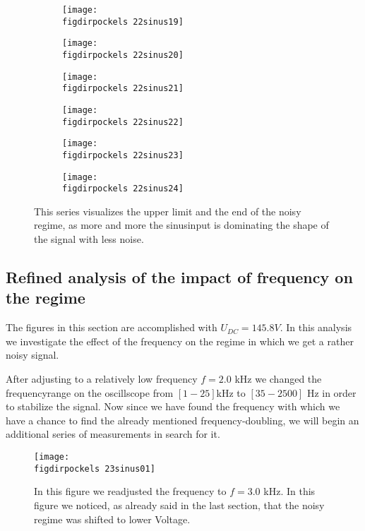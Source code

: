\begin{figure}
    \begin{subfigure}[b]{\picwidth}
        \texttt{[image: \\figdirpockels 22sinus19]}
        \caption{}
    \end{subfigure}\qquad
    \begin{subfigure}[b]{\picwidth}
        \texttt{[image: \\figdirpockels 22sinus20]}
        \caption{}
    \end{subfigure}
    \begin{subfigure}[b]{\picwidth}
        \texttt{[image: \\figdirpockels 22sinus21]}
        \caption{}
    \end{subfigure}
    \begin{subfigure}[b]{\picwidth}
        \texttt{[image: \\figdirpockels 22sinus22]}
        \caption{}
    \end{subfigure}
    \begin{subfigure}[b]{\picwidth}
        \texttt{[image: \\figdirpockels 22sinus23]}
        \caption{}
    \end{subfigure}
    \begin{subfigure}[b]{\picwidth}
        \texttt{[image: \\figdirpockels 22sinus24]}
        \caption{}
    \end{subfigure}

    \caption{This series visualizes the upper limit and the end
        of the noisy regime, as more and more the sinusinput
        is dominating the shape of the signal with less noise.}
    \label{fig:sinus4}
\end{figure}
\clearpage
\subsection{Refined analysis of the impact of frequency on 
    the regime}
The figures in this section are accomplished with $U_{DC}=145.8 V$.
In this analysis we investigate the effect of the frequency
on the regime in which we get a rather noisy signal. 

After
adjusting to a relatively low frequency $f=2.0$ kHz we changed
the frequencyrange on the oscillscope from 
$[1 - 25]$kHz to $[35 - 2500]$ Hz in order to stabilize the signal.
Now since we have found the frequency with which we have a chance
to find the already mentioned frequency-doubling, we will
begin an additional series of measurements in search for it. 

\begin{figure}
    \texttt{[image: \\figdirpockels 23sinus01]}
    \caption{In this figure we readjusted the frequency to
        $f=3.0$ kHz. In this figure we noticed, as already said
        in the last section, that the noisy regime was shifted
        to lower Voltage.}
\end{figure}

